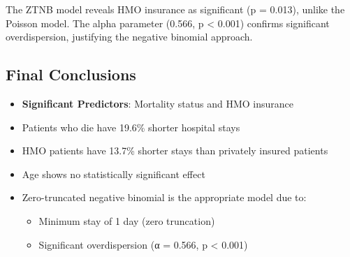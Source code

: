 \documentclass[12pt, a4paper]{article}
\begin{document}
\begin{insightbox}
The ZTNB model reveals HMO insurance as significant (p = 0.013), unlike the Poisson model. The alpha parameter (0.566, p < 0.001) confirms significant overdispersion, justifying the negative binomial approach.
\end{insightbox}

\subsection*{Final Conclusions}

\begin{itemize}
    \item \textbf{Significant Predictors}: Mortality status and HMO insurance
    \item Patients who die have 19.6\% shorter hospital stays
    \item HMO patients have 13.7\% shorter stays than privately insured patients
    \item Age shows no statistically significant effect
    \item Zero-truncated negative binomial is the appropriate model due to:
    \begin{itemize}
        \item Minimum stay of 1 day (zero truncation)
        \item Significant overdispersion (α = 0.566, p < 0.001)
    \end{itemize}
\end{itemize}
\end{document}
